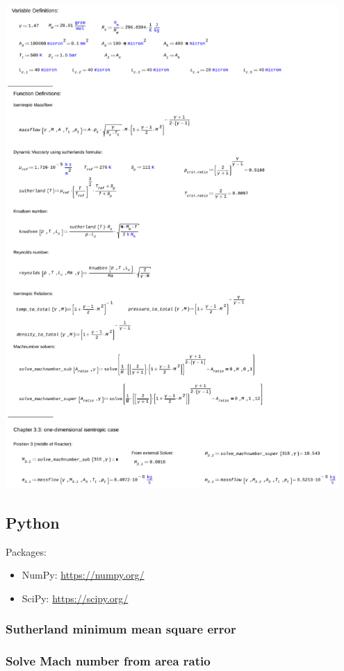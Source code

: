 \includegraphics[page=3, width=0.95\textwidth]{code/calculations_thesis.pdf}
\newpage
\blankpage

\subsection{Python}
Packages:
\begin{itemize}
	\item NumPy: \quad \url{https://numpy.org/}
	\item SciPy: \quad \url{https://scipy.org/}
\end{itemize}
\subsubsection{Sutherland minimum mean square error}
\label{apx:sutherland-py}

\newpage
\subsubsection{Solve Mach number from area ratio}
\label{apx:mach-py}

